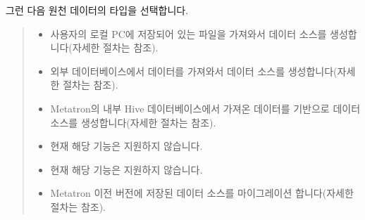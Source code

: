 \documentclass[letterpaper,10pt,english]{sphinxmanual}
\begin{document}
그런 다음 원천 데이터의 타입을 선택합니다.
\begin{quote}

\begin{figure}[H]
\centering

\noindent{}
\end{figure}
\begin{itemize}
\item {} 
 사용자의 로컬 PC에 저장되어 있는 파일을 가져와서 데이터 소스를 생성합니다(자세한 절차는 {\hyperref[\detokenize{discovery/part02/create_a_data_source:create-datasource-from-file}]{}} 참조).

\item {} 
 외부 데이터베이스에서 데이터를 가져와서 데이터 소스를 생성합니다(자세한 절차는 {\hyperref[\detokenize{discovery/part02/create_a_data_source:create-datasource-from-db}]{}} 참조).

\item {} 
 Metatron의 내부 Hive 데이터베이스에서 가져온 데이터를 기반으로 데이터 소스를 생성합니다(자세한 절차는 {\hyperref[\detokenize{discovery/part02/create_a_data_source:create-datasource-from-stagingdb}]{}} 참조).

\item {} 
 현재 해당 기능은 지원하지 않습니다.

\item {} 
 현재 해당 기능은 지원하지 않습니다.

\item {} 
 Metatron 이전 버전에 저장된 데이터 소스를 마이그레이션 합니다(자세한 절차는 {\hyperref[\detokenize{discovery/part02/create_a_data_source:create-datasource-from-metatron}]{}} 참조).

\end{itemize}
\end{quote}
\end{document}
